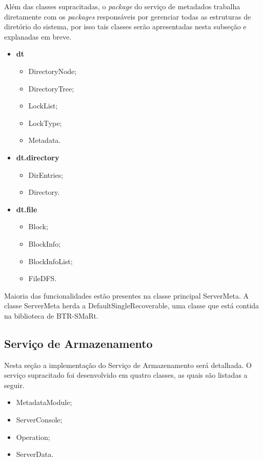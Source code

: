 Além das classes supracitadas, o \textit{package} do serviço de metadados trabalha diretamente com os \textit{packages} responsáveis por gerenciar todas as estruturas de diretório do sistema, por isso tais classes serão apresentadas nesta subseção e explanadas em breve.
\\

\begin{itemize}
	\item \textbf{dt}
	\begin{itemize}
		\item DirectoryNode;
		\item DirectoryTree;
		\item LockList;
		\item LockType;
		\item Metadata.
	\end{itemize}
	\item \textbf{dt.directory}
	\begin{itemize}
		\item DirEntries;
		\item Directory.
	\end{itemize}
	\item \textbf{dt.file}
	\begin{itemize}
		\item Block;
		\item BlockInfo;
		\item BlockInfoList;
		\item FileDFS.
	\end{itemize}
\end{itemize}



Maioria das funcionalidades estão presentes na classe principal ServerMeta.
A classe ServerMeta herda a DefaultSingleRecoverable, uma classe que está contida na biblioteca de BTR-SMaRt.


\subsection{Serviço de Armazenamento}
Nesta seção a implementação do Serviço de Armazenamento será detalhada. O serviço supracitado foi desenvolvido em quatro classes, as quais são listadas a seguir.
\\

\begin{itemize}
	\item MetadataModule;
	\item ServerConsole;
	\item Operation;
	\item ServerData.
\end{itemize}

